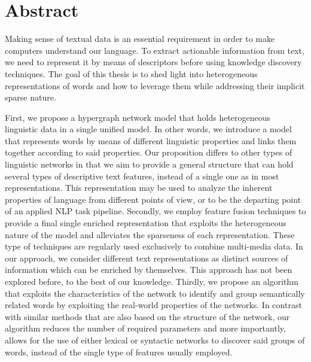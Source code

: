 \chapter*{Abstract}
Making sense of textual data is an essential requirement in order to make computers understand our language. To extract actionable information from text, we need to represent it by means of descriptors before using knowledge discovery techniques. The goal of this thesis is to shed light into heterogeneous representations of words and how to leverage them  while addressing their implicit sparse nature.

First, we  propose a hypergraph network model that holds heterogeneous linguistic data in a single unified model. In other words, we introduce a model that represents words by means of different linguistic properties and links them together according to said properties. Our proposition differs to other types of linguistic networks in that we aim to provide a general structure that can hold several types of descriptive text features, instead of a single one as in most representations. This representation may be used to analyze the inherent properties of language from different points of view, or to be the departing point of an applied NLP task pipeline. Secondly, we employ feature fusion techniques to provide a final single enriched representation that exploits the heterogeneous nature of the model and alleviates the sparseness of each representation.
These type of techniques are regularly used exclusively to combine multi-media data. In our approach, we consider different text representations as distinct sources of information which can be enriched by themselves. This approach has not been explored before, to the best of our knowledge.
Thirdly, we propose an algorithm that exploits the characteristics of the network to identify and group semantically related words by exploiting the real-world properties of the networks. In contrast with similar methods that are also based on the structure of the network, our algorithm reduces the number of required parameters and more importantly, allows for the use of either lexical or syntactic networks to discover said groups of words, instead of the single type of features usually employed.

